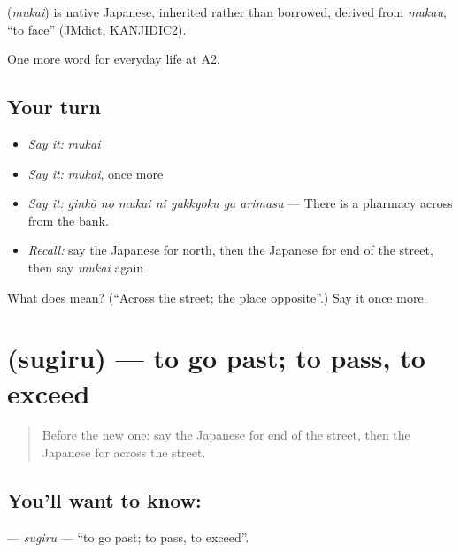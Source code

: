 \begin{cousinweb}
\textbf{} (\emph{mukai}) is native Japanese, inherited rather than borrowed, derived from \emph{mukau}, \textquotedblleft{}to face\textquotedblright{} (JMdict, KANJIDIC2).
\end{cousinweb}

\begin{grammarlens}[title={What you've built}]
One more word for everyday life at A2.
\end{grammarlens}

\subsection*{Your turn}
\begin{itemize}
\raggedright
  \item \emph{Say it:} \emph{mukai}
  \item \emph{Say it:} \emph{mukai}, once more
  \item \emph{Say it:} \emph{ginkō no mukai ni yakkyoku ga arimasu} — There is a pharmacy across from the bank.
  \item \emph{Recall:} say the Japanese for north, then the Japanese for end of the street, then say \emph{mukai} again
\end{itemize}

\begin{tcolorbox}[breakable,colback=teal!4,colframe=teal!35!black,title={Before you move on}]
What does  mean? (\textquotedblleft{}Across the street; the place opposite\textquotedblright{}.) Say it once more.
\end{tcolorbox}
\section[\texorpdfstring{\ja{すぎる} (sugiru)}{すぎる (sugiru)}]{ (sugiru) — to go past; to pass, to exceed}

\label{lesson:JA-C195-sugiru}



\begin{quote}
Before the new one: say the Japanese for end of the street, then the Japanese for across the street.
\end{quote}

\subsection*{You'll want to know: }
\textbf{} — \emph{sugiru} — \textquotedblleft{}to go past; to pass, to exceed\textquotedblright{}.

